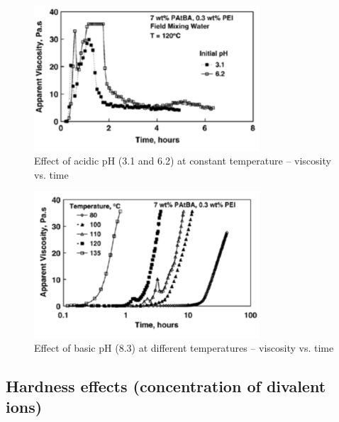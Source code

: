 \begin{figure}
    \centering
    \includegraphics[width=0.75\textwidth]{img/fig/almuntasheriAcidicpH.png}
    \caption{Effect of acidic pH (3.1 and 6.2) at constant temperature – viscosity vs. time \citep{Al-Muntasheri2007}}
    \label{fig:almuntasheriAcidicpH} %
\end{figure}

\begin{figure}
    \centering
    \includegraphics[width=0.75\textwidth]{img/fig/almuntasheriBasicpH.png}
    \caption{Effect of basic pH (8.3) at different temperatures – viscosity vs. time \citep{Al-Muntasheri2007}}
    \label{fig:almuntasheriBasicpH} %
\end{figure}

\subsection{Hardness effects (concentration of divalent ions)}

